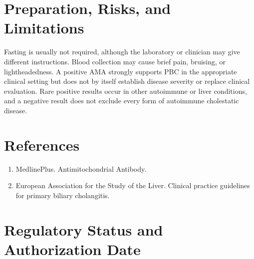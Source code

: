 \section*{Preparation, Risks, and Limitations}
Fasting is usually not required, although the laboratory or clinician may give different instructions. Blood collection may cause brief pain, bruising, or lightheadedness. A positive AMA strongly supports PBC in the appropriate clinical setting but does not by itself establish disease severity or replace clinical evaluation. Rare positive results occur in other autoimmune or liver conditions, and a negative result does not exclude every form of autoimmune cholestatic disease.

\section*{References}
\begin{enumerate}
  \item MedlinePlus. Antimitochondrial Antibody.
  \item European Association for the Study of the Liver. Clinical practice guidelines for primary biliary cholangitis.
\end{enumerate}

\clearpage


\section*{Regulatory Status and Authorization Date}

\clearpage
